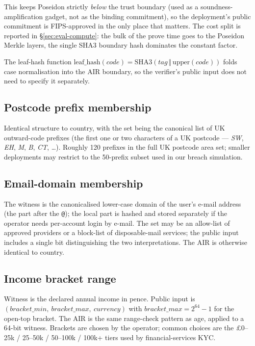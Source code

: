 \documentclass[11pt,a4paper]{article}
\begin{document}
This keeps Poseidon strictly \emph{below} the trust boundary
(used as a soundness\nobreakdash-amplification gadget, not as
the binding commitment), so the deployment's public commitment
is FIPS\nobreakdash-approved in the only place that matters.
The cost split is reported in \S\ref{sec:eval-compute}: the bulk
of the prove time goes to the Poseidon Merkle layers, the
single SHA3 boundary hash dominates the constant factor.

The leaf\nobreakdash-hash function $\mathrm{leaf\_hash}(\mathit{code}) =
\mathrm{SHA3}(\mathit{tag} \,\Vert\, \mathrm{upper}(\mathit{code}))$
folds case normalisation into the AIR boundary, so the verifier's
public input does not need to specify it separately.

\subsection{Postcode prefix membership}
\label{sec:air-postcode}

Identical structure to country, with the set being the canonical
list of UK outward\nobreakdash-code prefixes (the first one or two
characters of a UK postcode — \emph{SW}, \emph{EH}, \emph{M},
\emph{B}, \emph{CT}, …).  Roughly 120 prefixes in the full UK
postcode area set; smaller deployments may restrict to the
50\nobreakdash-prefix subset used in our breach simulation.

\subsection{Email-domain membership}
\label{sec:air-email}

The witness is the canonicalised lower\nobreakdash-case domain of the
user's e\nobreakdash-mail address (the part after the \texttt{@}); the
local part is hashed and stored separately if the operator needs
per\nobreakdash-account login by e\nobreakdash-mail.  The set may be an
allow\nobreakdash-list of approved providers or a block\nobreakdash-list
of disposable\nobreakdash-mail services; the public input includes a
single bit distinguishing the two interpretations.  The AIR is
otherwise identical to country.

\subsection{Income bracket range}
\label{sec:air-income}

Witness is the declared annual income in pence.  Public input is
$(\mathit{bracket\_min},\ \mathit{bracket\_max},\ \mathit{currency})$
with $\mathit{bracket\_max} = 2^{64} - 1$ for the
open\nobreakdash-top bracket.  The AIR is the same range\nobreakdash-check
pattern as age, applied to a 64\nobreakdash-bit witness.  Brackets are
chosen by the operator; common choices are the
£0\nobreakdash--25k / 25\nobreakdash--50k / 50\nobreakdash--100k /
100k+ tiers used by financial\nobreakdash-services KYC.
\end{document}

